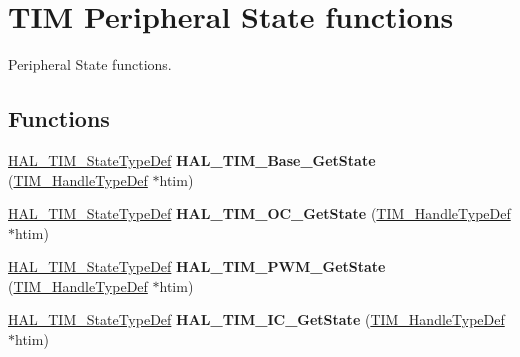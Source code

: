 \hypertarget{group___t_i_m___exported___functions___group10}{}\section{T\+IM Peripheral State functions}
\label{group___t_i_m___exported___functions___group10}


Peripheral State functions.  


\subsection*{Functions}
\begin{DoxyCompactItemize}
\item 
\mbox{\label{group___t_i_m___exported___functions___group10_gabf71ed10e30d23139f7b327878901c89}} 
\hyperlink{group___t_i_m___exported___types_gae0994cf5970e56ca4903e9151f40010c}{H\+A\+L\+\_\+\+T\+I\+M\+\_\+\+State\+Type\+Def} {\bfseries H\+A\+L\+\_\+\+T\+I\+M\+\_\+\+Base\+\_\+\+Get\+State} (\hyperlink{struct_t_i_m___handle_type_def}{T\+I\+M\+\_\+\+Handle\+Type\+Def} $\ast$htim)
\item 
\mbox{\label{group___t_i_m___exported___functions___group10_ga9dbca6a4ca949a13fda097d9cc7959a0}} 
\hyperlink{group___t_i_m___exported___types_gae0994cf5970e56ca4903e9151f40010c}{H\+A\+L\+\_\+\+T\+I\+M\+\_\+\+State\+Type\+Def} {\bfseries H\+A\+L\+\_\+\+T\+I\+M\+\_\+\+O\+C\+\_\+\+Get\+State} (\hyperlink{struct_t_i_m___handle_type_def}{T\+I\+M\+\_\+\+Handle\+Type\+Def} $\ast$htim)
\item 
\mbox{\label{group___t_i_m___exported___functions___group10_ga207c64afb37d15e35b5380d4805e6eaf}} 
\hyperlink{group___t_i_m___exported___types_gae0994cf5970e56ca4903e9151f40010c}{H\+A\+L\+\_\+\+T\+I\+M\+\_\+\+State\+Type\+Def} {\bfseries H\+A\+L\+\_\+\+T\+I\+M\+\_\+\+P\+W\+M\+\_\+\+Get\+State} (\hyperlink{struct_t_i_m___handle_type_def}{T\+I\+M\+\_\+\+Handle\+Type\+Def} $\ast$htim)
\item 
\mbox{\label{group___t_i_m___exported___functions___group10_ga8f6d20b8e4f3255f1f0f3ced8ea684e8}} 
\hyperlink{group___t_i_m___exported___types_gae0994cf5970e56ca4903e9151f40010c}{H\+A\+L\+\_\+\+T\+I\+M\+\_\+\+State\+Type\+Def} {\bfseries H\+A\+L\+\_\+\+T\+I\+M\+\_\+\+I\+C\+\_\+\+Get\+State} (\hyperlink{struct_t_i_m___handle_type_def}{T\+I\+M\+\_\+\+Handle\+Type\+Def} $\ast$htim)

\end{DoxyCompactItemize}
